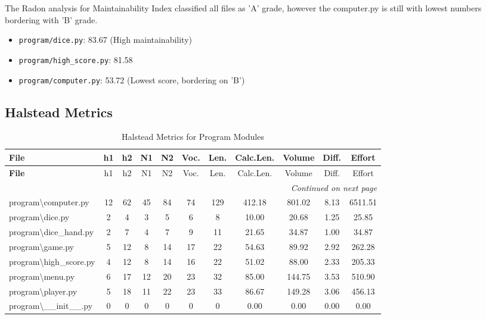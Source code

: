 \documentclass{article}
\begin{document}
The Radon analysis for Maintainability Index classified all files as 'A' grade, however the computer.py is still with lowest numbers bordering with 'B' grade.

\begin{itemize}
    \item \texttt{program/dice.py}: 83.67 (High maintainability)
    \item \texttt{program/high\_score.py}: 81.58
    \item \texttt{program/computer.py}: 53.72 (Lowest score, bordering on 'B')
\end{itemize}

\subsection{Halstead Metrics}

\begin{longtable}{|l|c|c|c|c|c|c|c|c|c|c|}
    \caption{Halstead Metrics for Program Modules}                                                                 \\
    \toprule
    \textbf{File}                         & h1 & h2 & N1 & N2 & Voc. & Len. & Calc.Len. & Volume & Diff. & Effort  \\
    \midrule
    \endfirsthead
    \toprule
    \textbf{File}                         & h1 & h2 & N1 & N2 & Voc. & Len. & Calc.Len. & Volume & Diff. & Effort  \\
    \midrule
    \endhead
    \midrule
    \multicolumn{11}{r}{\textit{Continued on next page}}                                                           \\
    \bottomrule
    \endfoot
    \bottomrule
    \endlastfoot
    
    program\textbackslash computer.py     & 12 & 62 & 45 & 84 & 74   & 129  & 412.18    & 801.02 & 8.13  & 6511.51 \\
    program\textbackslash dice.py         & 2  & 4  & 3  & 5  & 6    & 8    & 10.00     & 20.68  & 1.25  & 25.85   \\
    program\textbackslash dice\_hand.py   & 2  & 7  & 4  & 7  & 9    & 11   & 21.65     & 34.87  & 1.00  & 34.87   \\
    program\textbackslash game.py         & 5  & 12 & 8  & 14 & 17   & 22   & 54.63     & 89.92  & 2.92  & 262.28  \\
    program\textbackslash high\_score.py  & 4  & 12 & 8  & 14 & 16   & 22   & 51.02     & 88.00  & 2.33  & 205.33  \\
    program\textbackslash menu.py         & 6  & 17 & 12 & 20 & 23   & 32   & 85.00     & 144.75 & 3.53  & 510.90  \\
    program\textbackslash player.py       & 5  & 18 & 11 & 22 & 23   & 33   & 86.67     & 149.28 & 3.06  & 456.13  \\
    program\textbackslash \_\_init\_\_.py & 0  & 0  & 0  & 0  & 0    & 0    & 0.00      & 0.00   & 0.00  & 0.00    \\
    
\end{longtable}
\end{document}

